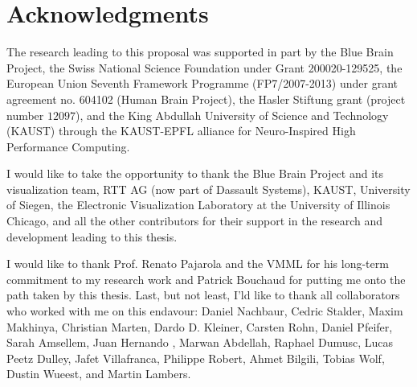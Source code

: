 

\chapter*{Acknowledgments}
The research leading to this proposal was supported in part by the Blue Brain
Project, the Swiss National Science Foundation under Grant 200020-129525, the
European Union Seventh Framework Programme (FP7/2007-2013) under grant agreement
no. 604102 (Human Brain Project), the Hasler Stiftung grant (project number
$12097$), and the King Abdullah University of Science and Technology (KAUST)
through the KAUST-EPFL alliance for Neuro-Inspired High Performance Computing.

I would like to take the opportunity to thank the Blue Brain Project and its
visualization team, RTT AG (now part of Dassault Systems), KAUST, University of
Siegen, the Electronic Visualization Laboratory at the University of Illinois
Chicago, and all the other contributors for their support in the research and
development leading to this thesis.

I would like to thank Prof. Renato Pajarola and the VMML for his long-term
commitment to my research work and Patrick Bouchaud for putting me onto the
path taken by this thesis. Last, but not least, I'ld like to thank all
collaborators who worked with me on this endavour: Daniel Nachbaur, Cedric
Stalder, Maxim Makhinya, Christian Marten, Dardo D. Kleiner, Carsten Rohn,
Daniel Pfeifer, Sarah Amsellem, Juan Hernando , Marwan Abdellah, Raphael
Dumusc, Lucas Peetz Dulley, Jafet Villafranca, Philippe Robert, Ahmet Bilgili,
Tobias Wolf, Dustin Wueest, and Martin Lambers.
